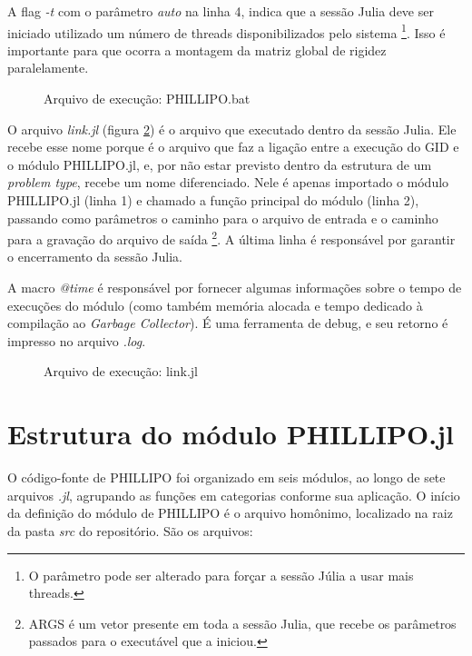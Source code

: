 A flag \emph{-t} com o parâmetro \emph{auto} na linha 4, indica que a sessão Julia deve ser iniciado utilizado um número de threads disponibilizados pelo sistema \footnote{O parâmetro pode ser alterado para forçar a sessão Júlia a usar mais threads.}. Isso é importante para que ocorra a montagem da matriz global de rigidez paralelamente.

\begin{figure}[hbtp]
    \caption{Arquivo de execução: PHILLIPO.bat}
    
    \label{fig:PHILLIPO.bat}
\end{figure}

O arquivo \emph{link.jl} (figura \ref{fig:link.jl}) é o arquivo que executado dentro da sessão Julia. Ele recebe esse nome porque é o arquivo que faz a ligação entre a execução do GID e o módulo PHILLIPO.jl, e, por não estar previsto dentro da estrutura de um \emph{problem type}, recebe um nome diferenciado. Nele é apenas importado o módulo PHILLIPO.jl  (linha 1) e chamado a função principal do módulo (linha 2), passando como parâmetros o caminho para o arquivo de entrada e o caminho para a gravação do arquivo de saída \footnote{ARGS é um vetor presente em toda a sessão Julia, que recebe os parâmetros passados para o executável que a iniciou.}. A última linha é responsável por garantir o encerramento da sessão Julia.

A macro \emph{@time} é responsável por fornecer algumas informações sobre o tempo de execuções do módulo (como também memória alocada e tempo dedicado à compilação ao \emph{Garbage Collector}). É uma ferramenta de debug, e seu retorno é impresso no arquivo \emph{.log}.

\begin{figure}[hbtp]
    \caption{Arquivo de execução: link.jl}
    
    \label{fig:link.jl}
\end{figure}

\section{Estrutura do módulo PHILLIPO.jl}

O código-fonte de PHILLIPO foi organizado em seis módulos, ao longo de sete arquivos \emph{.jl}, agrupando as funções em categorias conforme sua aplicação. O início da definição do módulo de PHILLIPO é o arquivo homônimo, localizado na raiz da pasta \emph{src} do repositório. São os arquivos:


